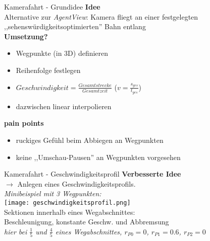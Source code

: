 

\begin{frame}{Kamerafahrt - Grundidee}
	\textbf{Idee}\\
	\vspace{0.1cm}
	\pause Alternative zur \textit{AgentView}: Kamera fliegt an einer festgelegten ,,sehenswürdigkeitsoptimierten'' Bahn entlang\\
	\vspace{0.3cm}
	\pause\textbf{Umsetzung?}\\
	\begin{itemize}
		\pause\item Wegpunkte (in 3D) definieren
		\pause\item Reihenfolge festlegen
		\pause\item $Geschwindigkeit = \frac{Gesamtstrecke}{Gesamtzeit}$ {\color{gray}($v = \frac{s_{ges}}{t_{ges}}$)}
		\pause\item dazwischen linear interpolieren
	\end{itemize}
	\pause\textbf{pain points}\\
	\begin{itemize}
		\pause\item ruckiges Gefühl beim Abbiegen an Wegpunkten
		\pause\item keine ,,Umschau-Pausen'' an Wegpunkten vorgesehen
	\end{itemize}
\end{frame}


\begin{frame}{Kamerafahrt - Geschwindigkeitsprofil}
	\textbf{Verbesserte Idee}\\
	\vspace{0.1cm}
	\pause $\rightarrow$ Anlegen eines Geschwindigkeitsprofils.\\
	\pause\textit{Minibeispiel mit 3 Wegpunkten:}\\
	\pause\texttt{[image: geschwindigkeitsprofil.png]}\\
	 Sektionen innerhalb eines Wegabschnittes:\\
	\pause Beschleunigung, konstante Geschw. und Abbremsung\\
	\pause \textit{hier bei $\frac{1}{5}$ und $\frac{4}{5}$ eines Wegabschnittes\pause, $r_{P0} = 0$, $r_{P1} = 0.6$, $r_{P2} = 0$}
\end{frame}


